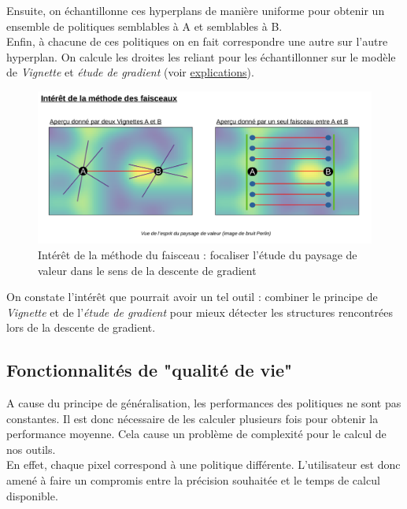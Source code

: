 \documentclass[12pt]{article}
\begin{document}
Ensuite, on échantillonne ces hyperplans de manière uniforme pour obtenir un ensemble de politiques semblables à A et semblables à B. \\

Enfin, à chacune de ces politiques on en fait correspondre une autre sur l'autre hyperplan. On calcule les droites les reliant pour les échantillonner sur le modèle de \emph{Vignette} et \emph{étude de gradient} (voir \hyperref[fig:ligne1]{explications}). \\

\begin{figure}[htp]
    \centering
    \includegraphics[width=15cm]{Images/faisceaux_interet}
    \caption{Intérêt de la méthode du faisceau : focaliser l'étude du paysage de valeur dans le sens de la descente de gradient}
    \label{fig:faisceauxInteret}
\end{figure}

On constate l'intérêt que pourrait avoir un tel outil : combiner le principe de \emph{Vignette} et de l'\emph{étude de gradient} pour mieux détecter les structures rencontrées lors de la descente de gradient. \\

\subsection{Fonctionnalités de "qualité de vie"}

A cause du principe de généralisation, les performances des politiques ne sont pas constantes. Il est donc nécessaire de les calculer plusieurs fois pour obtenir la performance moyenne. Cela cause un problème de complexité pour le calcul de nos outils. \\

En effet, chaque pixel correspond à une politique différente. L'utilisateur est donc amené à faire un compromis entre la précision souhaitée et le temps de calcul disponible. \\
\end{document}
